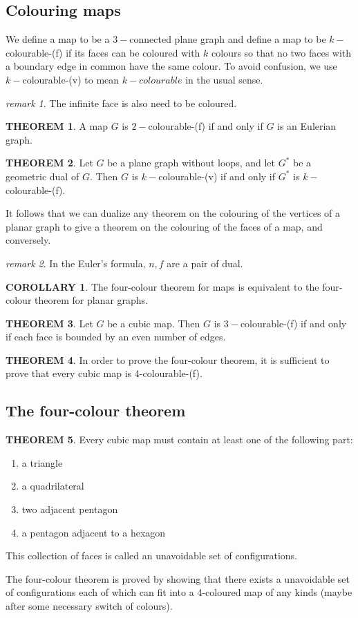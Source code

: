 \documentclass[a4paper,11pt]{article}%
\theoremstyle{remark}
\newtheorem*{remark}{remark}
\theoremstyle{definition}
\newtheorem{theorem}{THEOREM}[section]
\theoremstyle{definition}
\newtheorem{corollary}{COROLLARY}[section]
\theoremstyle{definition}
\theoremstyle{definition}
\theoremstyle{plain}
\theoremstyle{definition}
\begin{document}
\subsection{Colouring maps}
We define a map to be a $3-$connected plane graph and define a map to be $k-$colourable-(f) if its faces can be coloured 
with $k$ colours so that no two faces with a boundary edge in common have the same colour. 
To avoid confusion, we use $k-$colourable-(v) to mean $k-colourable$ in the usual sense.
\begin{remark}
    The infinite face is also need to be coloured.
\end{remark}
\begin{theorem}
    A map $G$ is $2-$colourable-(f) if and only if $G$ is an Eulerian graph.
\end{theorem}
\begin{theorem}
    Let $G$ be a plane graph without loops, and let $G^*$ be a geometric dual of $G$. Then $G$ is $k-$colourable-(v)
    if and only if $G^*$ is $k-$colourable-(f).
\end{theorem}
It follows that we can dualize any theorem on the colouring of the vertices of a planar graph to give a theorem on the colouring of the 
faces of a map, and conversely.
\begin{remark}
    In the Euler's formula, $n,f$ are a pair of dual.
\end{remark}
\begin{corollary}
The four-colour theorem for maps is equivalent to the four-colour theorem for planar graphs.
\end{corollary}
\begin{theorem}
    Let $G$ be a cubic map. Then $G$ is $3-$colourable-(f) if and only if each face is bounded by an even number of edges.
\end{theorem}
\begin{theorem}
    In order to prove the four-colour theorem, it is sufficient to prove that every cubic map is 4-colourable-(f).
\end{theorem}
\subsection{The four-colour theorem}
\begin{theorem}
    Every cubic map must contain at least one of the following part:
    \begin{enumerate}
        \item a triangle 
        \item a quadrilateral
        \item two adjacent pentagon
        \item a pentagon adjacent to a hexagon
    \end{enumerate}
    This collection of faces is called an unavoidable set of configurations.
\end{theorem}
The four-colour theorem is proved by showing that there exists a unavoidable set of configurations each of which 
can fit into a 4-coloured map of any kinds (maybe after some necessary switch of colours).
\end{document}
